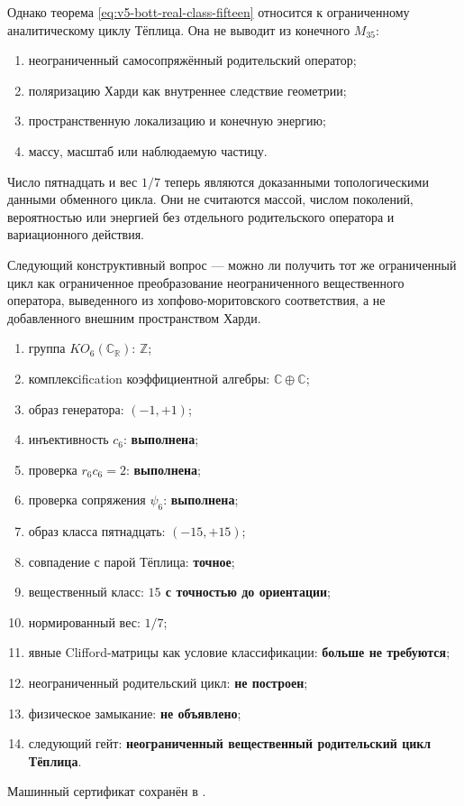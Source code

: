 Однако теорема \eqref{eq:v5-bott-real-class-fifteen} относится к
ограниченному аналитическому циклу Тёплица. Она не выводит из конечного
$M_{35}$:
\begin{enumerate}
 \item неограниченный самосопряжённый родительский оператор;
 \item поляризацию Харди как внутреннее следствие геометрии;
 \item пространственную локализацию и конечную энергию;
 \item массу, масштаб или наблюдаемую частицу.
\end{enumerate}

\begin{nogocriterion}
Число пятнадцать и вес $1/7$ теперь являются доказанными топологическими
данными обменного цикла. Они не считаются массой, числом поколений,
вероятностью или энергией без отдельного родительского оператора и
вариационного действия.
\end{nogocriterion}

Следующий конструктивный вопрос --- можно ли получить тот же ограниченный
цикл как ограниченное преобразование неограниченного вещественного
оператора, выведенного из хопфово-моритовского соответствия, а не
добавленного внешним пространством Харди.

\begin{protocol}
\begin{enumerate}
 \item группа $KO_6(\mathbb C_{\mathbb R})$: \textbf{$\mathbb Z$};
 \item комплексification коэффициентной алгебры:
 \textbf{$\mathbb C\oplus\mathbb C$};
 \item образ генератора: \textbf{$(-1,+1)$};
 \item инъективность $c_6$: \textbf{выполнена};
 \item проверка $r_6c_6=2$: \textbf{выполнена};
 \item проверка сопряжения $\psi_6$: \textbf{выполнена};
 \item образ класса пятнадцать: \textbf{$(-15,+15)$};
 \item совпадение с парой Тёплица: \textbf{точное};
 \item вещественный класс: \textbf{$15$ с точностью до ориентации};
 \item нормированный вес: \textbf{$1/7$};
 \item явные Clifford-матрицы как условие классификации:
 \textbf{больше не требуются};
 \item неограниченный родительский цикл: \textbf{не построен};
 \item физическое замыкание: \textbf{не объявлено};
 \item следующий гейт:
 \textbf{неограниченный вещественный родительский цикл Тёплица}.
\end{enumerate}
\end{protocol}

Машинный сертификат сохранён в
.